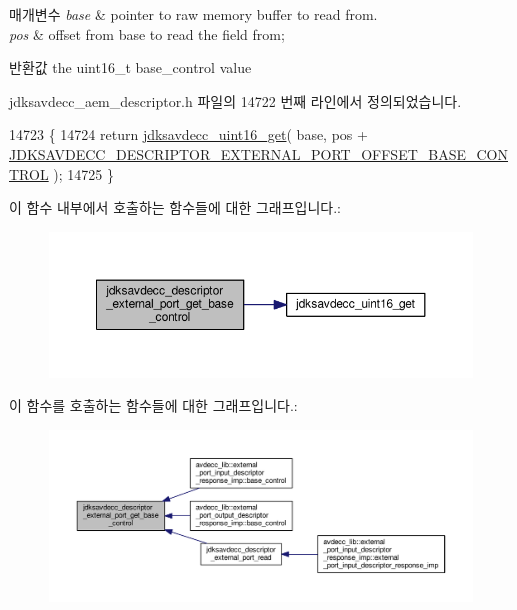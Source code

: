 \begin{DoxyParams}{매개변수}
{\em base} & pointer to raw memory buffer to read from. \\
\hline
{\em pos} & offset from base to read the field from; \\
\hline
\end{DoxyParams}
\begin{DoxyReturn}{반환값}
the uint16\+\_\+t base\+\_\+control value 
\end{DoxyReturn}


jdksavdecc\+\_\+aem\+\_\+descriptor.\+h 파일의 14722 번째 라인에서 정의되었습니다.


\begin{DoxyCode}
14723 \{
14724     \textcolor{keywordflow}{return} \hyperlink{group__endian_ga3fbbbc20be954aa61e039872965b0dc9}{jdksavdecc\_uint16\_get}( base, pos + 
      \hyperlink{group__descriptor__external__port_gac463f143c1e46725c5a8da713b556b35}{JDKSAVDECC\_DESCRIPTOR\_EXTERNAL\_PORT\_OFFSET\_BASE\_CONTROL}
       );
14725 \}
\end{DoxyCode}


이 함수 내부에서 호출하는 함수들에 대한 그래프입니다.\+:
\nopagebreak
\begin{figure}[H]
\begin{center}
\leavevmode
\includegraphics[width=350pt]{group__descriptor__external__port_ga1272176989bcc7802c5eb3a5be6b89f4_cgraph}
\end{center}
\end{figure}




이 함수를 호출하는 함수들에 대한 그래프입니다.\+:
\nopagebreak
\begin{figure}[H]
\begin{center}
\leavevmode
\includegraphics[width=350pt]{group__descriptor__external__port_ga1272176989bcc7802c5eb3a5be6b89f4_icgraph}
\end{center}
\end{figure}


